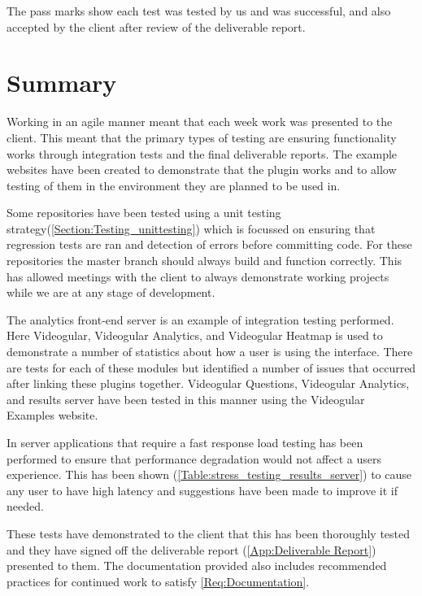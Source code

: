 The pass marks show each test was tested by us and was successful, and also accepted by the client after review of the deliverable report.

\section{Summary}

Working in an agile manner meant that each week work was presented to the client. This meant that the primary types of testing are ensuring functionality works through integration tests and the final deliverable reports. The example websites have been created to demonstrate that the plugin works and to allow testing of them in the environment they are planned to be used in.

Some repositories have been tested using a unit testing strategy(\autoref{Section:Testing_unittesting}) which is focussed on ensuring that regression tests are ran and detection of errors before committing code. For these repositories the master branch should always build and function correctly. This has allowed meetings with the client to always demonstrate working projects while we are at any stage of development.

The analytics front-end server is an example of integration testing performed. Here \gls{Videogular}, Videogular Analytics, and Videogular Heatmap is used to demonstrate a number of statistics about how a user is using the interface. There are tests for each of these modules but identified a number of issues that occurred after linking these plugins together. Videogular Questions, Videogular Analytics, and results server have been tested in this manner using the Videogular Examples website.

In server applications that require a fast response load testing has been performed to ensure that performance degradation would not affect a users experience. This has been shown (\autoref{Table:stress_testing_results_server}) to cause any user to have high latency and suggestions have been made to improve it if needed.

These tests have demonstrated to the client that this has been thoroughly tested and they have signed off the deliverable report (\cref{App:Deliverable Report}) presented to them. The documentation provided also includes recommended practices for continued work to satisfy \cref{Req:Documentation}.